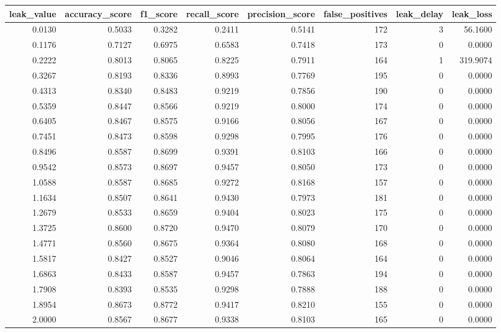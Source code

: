 \begin{tabular}{rrrrrrrr}
\toprule
leak\_value & accuracy\_score & f1\_score & recall\_score & precision\_score & false\_positives & leak\_delay & leak\_loss \\
\midrule
0.0130 & 0.5033 & 0.3282 & 0.2411 & 0.5141 & 172 & 3 & 56.1600 \\
0.1176 & 0.7127 & 0.6975 & 0.6583 & 0.7418 & 173 & 0 & 0.0000 \\
0.2222 & 0.8013 & 0.8065 & 0.8225 & 0.7911 & 164 & 1 & 319.9074 \\
0.3267 & 0.8193 & 0.8336 & 0.8993 & 0.7769 & 195 & 0 & 0.0000 \\
0.4313 & 0.8340 & 0.8483 & 0.9219 & 0.7856 & 190 & 0 & 0.0000 \\
0.5359 & 0.8447 & 0.8566 & 0.9219 & 0.8000 & 174 & 0 & 0.0000 \\
0.6405 & 0.8467 & 0.8575 & 0.9166 & 0.8056 & 167 & 0 & 0.0000 \\
0.7451 & 0.8473 & 0.8598 & 0.9298 & 0.7995 & 176 & 0 & 0.0000 \\
0.8496 & 0.8587 & 0.8699 & 0.9391 & 0.8103 & 166 & 0 & 0.0000 \\
0.9542 & 0.8573 & 0.8697 & 0.9457 & 0.8050 & 173 & 0 & 0.0000 \\
1.0588 & 0.8587 & 0.8685 & 0.9272 & 0.8168 & 157 & 0 & 0.0000 \\
1.1634 & 0.8507 & 0.8641 & 0.9430 & 0.7973 & 181 & 0 & 0.0000 \\
1.2679 & 0.8533 & 0.8659 & 0.9404 & 0.8023 & 175 & 0 & 0.0000 \\
1.3725 & 0.8600 & 0.8720 & 0.9470 & 0.8079 & 170 & 0 & 0.0000 \\
1.4771 & 0.8560 & 0.8675 & 0.9364 & 0.8080 & 168 & 0 & 0.0000 \\
1.5817 & 0.8427 & 0.8527 & 0.9046 & 0.8064 & 164 & 0 & 0.0000 \\
1.6863 & 0.8433 & 0.8587 & 0.9457 & 0.7863 & 194 & 0 & 0.0000 \\
1.7908 & 0.8393 & 0.8535 & 0.9298 & 0.7888 & 188 & 0 & 0.0000 \\
1.8954 & 0.8673 & 0.8772 & 0.9417 & 0.8210 & 155 & 0 & 0.0000 \\
2.0000 & 0.8567 & 0.8677 & 0.9338 & 0.8103 & 165 & 0 & 0.0000 \\
\bottomrule
\end{tabular}
